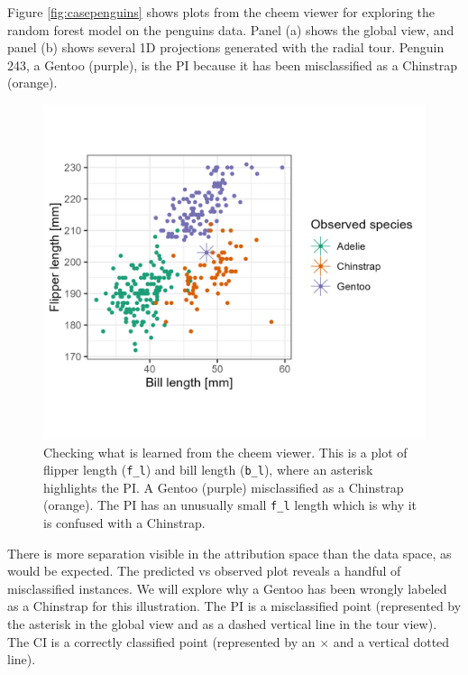 \documentclass[
]{article}
\begin{document}
Figure \ref{fig:casepenguins} shows plots from the cheem viewer for exploring the random forest model on the penguins data. Panel (a) shows the global view, and panel (b) shows several 1D projections generated with the radial tour. Penguin 243, a Gentoo (purple), is the PI because it has been misclassified as a Chinstrap (orange).



\begin{figure}

{\centering \includegraphics[width=0.6\linewidth]{./figures/case_penguins_BlFl} 

}

\caption{Checking what is learned from the cheem viewer. This is a plot of flipper length (\texttt{f\_l}) and bill length (\texttt{b\_l}), where an asterisk highlights the PI. A Gentoo (purple) misclassified as a Chinstrap (orange). The PI has an unusually small \texttt{f\_l} length which is why it is confused with a Chinstrap.}\label{fig:casepenguinsblfl}
\end{figure}

There is more separation visible in the attribution space than the data space, as would be expected. The predicted vs observed plot reveals a handful of misclassified instances. We will explore why a Gentoo has been wrongly labeled as a Chinstrap for this illustration. The PI is a misclassified point (represented by the asterisk in the global view and as a dashed vertical line in the tour view). The CI is a correctly classified point (represented by an \(\times\) and a vertical dotted line).
\end{document}
